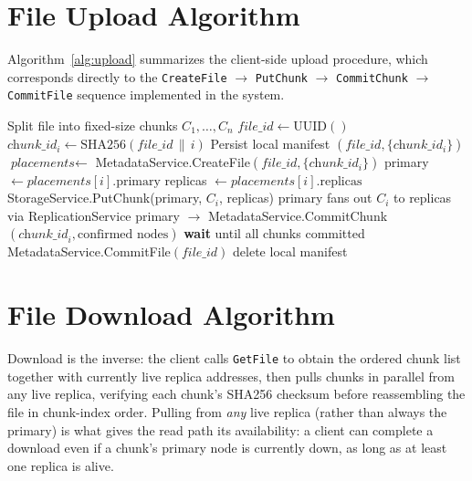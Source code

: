 \documentclass[12pt,a4paper]{report}
\begin{document}
\section{File Upload Algorithm}

Algorithm~\ref{alg:upload} summarizes the client-side upload procedure, which corresponds directly to the \texttt{CreateFile} $\rightarrow$ \texttt{PutChunk} $\rightarrow$ \texttt{CommitChunk} $\rightarrow$ \texttt{CommitFile} sequence implemented in the system.

\begin{algorithm}[h]
\caption{File Upload}
\label{alg:upload}
\begin{algorithmic}[1]
\State Split file into fixed-size chunks $C_1, \dots, C_n$
\State $\textit{file\_id} \gets \text{UUID}()$
    \State $\textit{chunk\_id}_i \gets \text{SHA256}(\textit{file\_id} \,\|\, i)$
\EndFor
\State Persist local manifest $(\textit{file\_id}, \{\textit{chunk\_id}_i\})$ 
\State $\textit{placements} \gets$ MetadataService.CreateFile$(\textit{file\_id}, \{\textit{chunk\_id}_i\})$
    \State primary $\gets \textit{placements}[i].\text{primary}$
    \State replicas $\gets \textit{placements}[i].\text{replicas}$
    \State StorageService.PutChunk(primary, $C_i$, replicas) 
    \State primary fans out $C_i$ to replicas via ReplicationService 
        \State primary $\to$ MetadataService.CommitChunk$(\textit{chunk\_id}_i, \text{confirmed nodes})$
    \EndIf
\EndFor
\State \textbf{wait} until all chunks committed
\State MetadataService.CommitFile$(\textit{file\_id})$
\State delete local manifest
\end{algorithmic}
\end{algorithm}

\section{File Download Algorithm}

Download is the inverse: the client calls \texttt{GetFile} to obtain the ordered chunk list together with currently live replica addresses, then pulls chunks in parallel from any live replica, verifying each chunk's SHA256 checksum before reassembling the file in chunk-index order. Pulling from \emph{any} live replica (rather than always the primary) is what gives the read path its availability: a client can complete a download even if a chunk's primary node is currently down, as long as at least one replica is alive.
\end{document}
